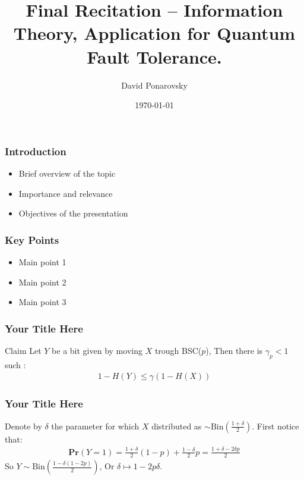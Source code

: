 \documentclass{beamer}
\begin{document}
 

\newcommand*{\Tr}{\textbf{Tr }}


\begin{frame}
    \title{Final Recitation – Information Theory, Application for Quantum Fault Tolerance.}
    \author{David Ponarovsky}
    \date{\today}
    \titlepage
\end{frame}


\begin{frame}

\frametitle{Introduction}
\begin{itemize}
    \item Brief overview of the topic
    \item Importance and relevance
    \item Objectives of the presentation
\end{itemize}
\end{frame}

\begin{frame}
\frametitle{Key Points}
\begin{itemize}
    \item Main point 1
    \item Main point 2
    \item Main point 3
\end{itemize}
\end{frame}

\begin{frame}
  \frametitle{Your Title Here}
  
\begin{block}{Claim}
  Let $Y$ be a bit given by moving $X$ trough BSC($p$), Then there is $\gamma_{p} < 1$ such :
  \begin{equation*}
    \begin{split}
      1 - H(Y) \le \gamma \left( 1 - H(X) \right)
    \end{split}
  \end{equation*}
\end{block}

\end{frame}

\begin{frame}
  \frametitle{Your Title Here}
  Denote by $\delta$ the parameter for which $X$ distributed as $\sim \text{Bin}(\frac{1+\delta}{2})$. First notice that:  
  \begin{equation*}
    \begin{split}
      \textbf{Pr}\left( Y = 1 \right) = \frac{1+\delta}{2} (1 -p) + \frac{1-\delta}{2}p = \frac{1 + \delta - 2\delta p}{2}  
    \end{split}
  \end{equation*}
  So $Y \sim \text{Bin}(  \frac{1 -\delta( 1 -  2 p)}{2} )$, Or $\delta \mapsto 1-2p \delta$. 
\end{frame}
\end{document}
